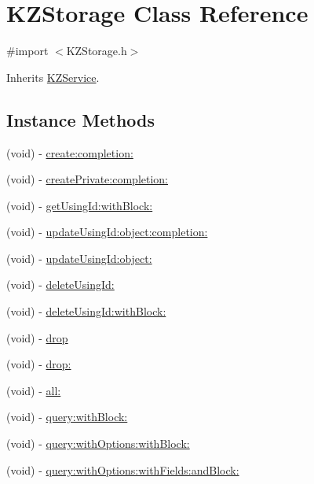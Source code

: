 \hypertarget{interface_k_z_storage}{\section{K\-Z\-Storage Class Reference}
\label{interface_k_z_storage}
}


{\ttfamily \#import $<$K\-Z\-Storage.\-h$>$}



Inherits \hyperlink{interface_k_z_service}{K\-Z\-Service}.

\subsection*{Instance Methods}
\begin{DoxyCompactItemize}
\item 
(void) -\/ \hyperlink{interface_k_z_storage_a57114d4cbe91af9483aa2e31cfddf388}{create\-:completion\-:}
\item 
(void) -\/ \hyperlink{interface_k_z_storage_ae90e69248a847b52a9a21a7fbfc7e4db}{create\-Private\-:completion\-:}
\item 
(void) -\/ \hyperlink{interface_k_z_storage_a38a5ed6979b6078126931e06dd3cff05}{get\-Using\-Id\-:with\-Block\-:}
\item 
(void) -\/ \hyperlink{interface_k_z_storage_a27b4f035cdd43fa1c8cccec710c849fa}{update\-Using\-Id\-:object\-:completion\-:}
\item 
(void) -\/ \hyperlink{interface_k_z_storage_a56581827b579eec18a1cd2b6d7a45dd0}{update\-Using\-Id\-:object\-:}
\item 
(void) -\/ \hyperlink{interface_k_z_storage_a4f909a38ee517f453c0e46caf803291d}{delete\-Using\-Id\-:}
\item 
(void) -\/ \hyperlink{interface_k_z_storage_a342972b6736f3841fc9a1287863aae7f}{delete\-Using\-Id\-:with\-Block\-:}
\item 
(void) -\/ \hyperlink{interface_k_z_storage_a0937f65280bb4ea7ad64c86edde29c2d}{drop}
\item 
(void) -\/ \hyperlink{interface_k_z_storage_a6acd78fcea7f458cf1335ad4fe9bc353}{drop\-:}
\item 
(void) -\/ \hyperlink{interface_k_z_storage_a90245c06a8bfe68fe78a937163578c59}{all\-:}
\item 
(void) -\/ \hyperlink{interface_k_z_storage_a9ce566f28a4410e0641c7c9d8b538a43}{query\-:with\-Block\-:}
\item 
(void) -\/ \hyperlink{interface_k_z_storage_a335c4aa836cf95dc080c354acdaac9b2}{query\-:with\-Options\-:with\-Block\-:}
\item 
(void) -\/ \hyperlink{interface_k_z_storage_a1b7854013fd5651960ad413756dbf711}{query\-:with\-Options\-:with\-Fields\-:and\-Block\-:}
\end{DoxyCompactItemize}
